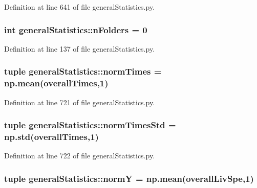 \-Definition at line 641 of file general\-Statistics.\-py.

\hypertarget{namespacegeneral_statistics_ad418d91181efd01508f2b136166cd854}{
\subsubsection[{n\-Folders}]{\setlength{\rightskip}{0pt plus 5cm}int {\bf general\-Statistics\-::n\-Folders} = 0}}\label{namespacegeneral_statistics_ad418d91181efd01508f2b136166cd854}


\-Definition at line 137 of file general\-Statistics.\-py.

\hypertarget{namespacegeneral_statistics_aa828d0bb88c0d1db3d8477b2452d8e25}{
\subsubsection[{norm\-Times}]{\setlength{\rightskip}{0pt plus 5cm}tuple {\bf general\-Statistics\-::norm\-Times} = np.\-mean({\bf overall\-Times},1)}}\label{namespacegeneral_statistics_aa828d0bb88c0d1db3d8477b2452d8e25}


\-Definition at line 721 of file general\-Statistics.\-py.

\hypertarget{namespacegeneral_statistics_aed3e07509d7b31285bf3975023e243e1}{
\subsubsection[{norm\-Times\-Std}]{\setlength{\rightskip}{0pt plus 5cm}tuple {\bf general\-Statistics\-::norm\-Times\-Std} = np.\-std({\bf overall\-Times},1)}}\label{namespacegeneral_statistics_aed3e07509d7b31285bf3975023e243e1}


\-Definition at line 722 of file general\-Statistics.\-py.

\hypertarget{namespacegeneral_statistics_a9693505ac595a3847a5d258750c5b115}{
\subsubsection[{norm\-Y}]{\setlength{\rightskip}{0pt plus 5cm}tuple {\bf general\-Statistics\-::norm\-Y} = np.\-mean({\bf overall\-Liv\-Spe},1)}}\label{namespacegeneral_statistics_a9693505ac595a3847a5d258750c5b115}


